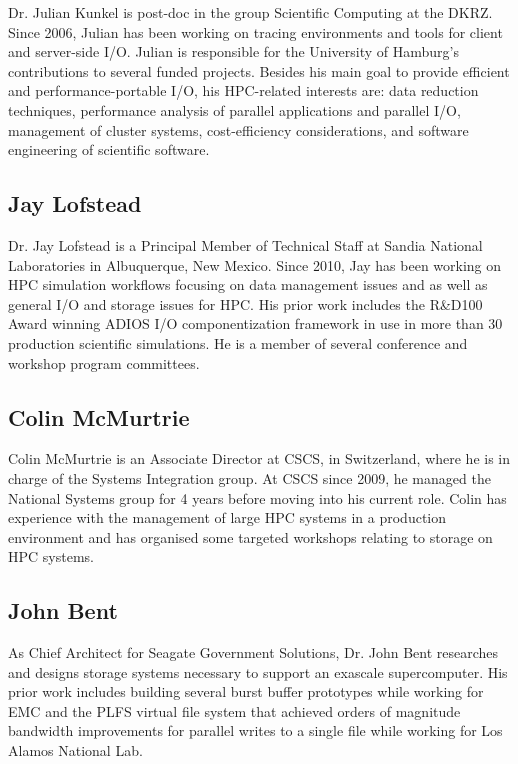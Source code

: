 \documentclass[a4paper,10pt]{article}
\begin{document}
Dr. Julian Kunkel is post-doc in the group Scientific Computing at the DKRZ.
Since 2006, Julian has been working on tracing environments and tools for client and server-side I/O.
Julian is responsible for the University of Hamburg's contributions to several funded projects.  
Besides his main goal to provide efficient and performance-portable I/O, his HPC-related interests are: data reduction techniques, performance analysis of parallel applications and parallel I/O, management of cluster systems, cost-efficiency considerations, and software engineering of scientific software.

\subsection{Jay Lofstead}
Dr. Jay Lofstead is a Principal Member of Technical Staff at Sandia National
Laboratories in Albuquerque, New Mexico. Since 2010, Jay has been working on
HPC simulation workflows focusing on data management issues and as well as
general I/O and storage issues for HPC.  His prior work includes the R\&D100
Award winning ADIOS I/O componentization framework in use in more than 30
production scientific simulations. He is a member of several conference and
workshop program committees.

\subsection{Colin McMurtrie}
Colin McMurtrie is an Associate Director at CSCS, in Switzerland, where he is in charge of the Systems Integration group.  At CSCS since 2009, he managed the National Systems group for 4 years before moving into his current role.  Colin has experience with the management of large HPC systems in a production environment and has organised some targeted workshops relating to storage on HPC systems.

\subsection{John Bent}
As Chief Architect for Seagate Government Solutions, Dr. John Bent researches and designs storage systems necessary to support an exascale supercomputer.  His prior work
includes building several burst buffer prototypes while working for EMC and the PLFS virtual file system that achieved orders of magnitude bandwidth improvements for parallel writes to a single file while working for Los Alamos National Lab.
\end{document}

